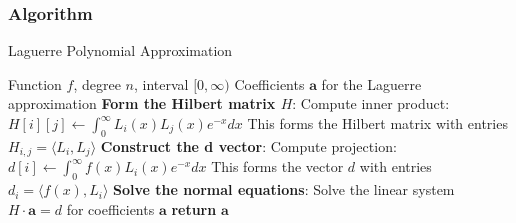 \documentclass[10pt]{article}
\begin{document}
\subsubsection{Algorithm}
\begin{algorithm}[H]
\caption{Laguerre Polynomial Approximation}\label{alg:laguerre}
\begin{algorithmic}
\Require Function $f$, degree $n$, interval $[0, \infty)$
\Ensure Coefficients $\mathbf{a}$ for the Laguerre approximation
\State \textbf{Form the Hilbert matrix $H$}:
        \State Compute inner product: $H[i][j] \gets \int_{0}^{\infty} L_i(x) L_j(x) e^{-x} dx$
        \State This forms the Hilbert matrix with entries $H_{i,j} = \langle L_i, L_j \rangle$
    \EndFor
\EndFor
\State \textbf{Construct the d vector}:
    \State Compute projection: $d[i] \gets \int_{0}^{\infty} f(x) L_i(x) e^{-x} dx$
    \State This forms the vector $d$ with entries $d_i = \langle f(x), L_i \rangle$
\EndFor
\State \textbf{Solve the normal equations}:
\State Solve the linear system $H \cdot \mathbf{a} = d$ for coefficients $\mathbf{a}$
\State \textbf{return} $\mathbf{a}$
\end{algorithmic}
\end{algorithm}
\end{document}
